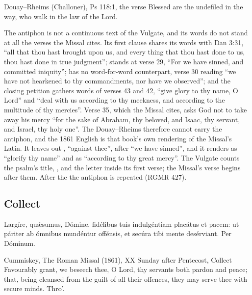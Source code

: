 \begin{englishwitness}{Douay--Rheims (Challoner), Ps 118:1, the verse}
Blessed are the undefiled in the way, who walk in the law of the Lord.
\end{englishwitness}

\noindent The antiphon is not a continuous text of the Vulgate, and its words do
not stand at all the verses the Missal cites. Its first clause shares its words
with Dan 3:31, ``all that thou hast brought upon us, and every thing that thou
hast done to us, thou hast done in true judgment'';  stands
at verse 29, ``For we have sinned, and committed iniquity'';  has no word-for-word counterpart, verse 30 reading ``we
have not hearkened to thy commandments, nor have we observed''; and the closing
petition gathers words of verses 43 and 42, ``give glory to thy name, O Lord''
and ``deal with us according to thy meekness, and according to the multitude of
thy mercies''. Verse 35, which the Missal cites, asks God not to take away his
mercy ``for the sake of Abraham, thy beloved, and Isaac, thy servant, and
Israel, thy holy one''. The Douay--Rheims therefore cannot carry the antiphon,
and the 1861 English is that book's own rendering of the Missal's Latin. It
leaves out , ``against thee'', after ``we have sinned'', and it
renders  as ``glorify thy name'' and
 as ``according to thy great
mercy''. The Vulgate counts the psalm's title, , and the
letter  inside its first verse; the Missal's verse begins after
them. After the  the antiphon is repeated (RGMR 427).

\subsection{Collect}
\label{proper-collect}


\begin{latinproper}
Largíre, quǽsumus, Dómine, fidélibus tuis indulgéntiam placátus et pacem: ut
páriter ab ómnibus mundéntur offénsis, et secúra tibi mente desérviant. Per
Dóminum.
\end{latinproper}

\begin{englishwitness}{Cummiskey, The Roman Missal (1861), XX Sunday after Pentecost, Collect}
Favourably grant, we beseech thee, O Lord, thy servants both pardon and peace;
that, being cleansed from the guilt of all their offences, they may serve thee
with secure minds. Thro'.
\end{englishwitness}

